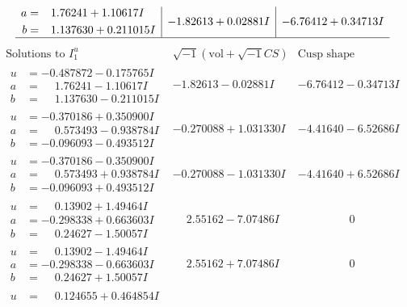 \documentclass[1p]{elsarticle_modified}
\theoremstyle{definition}
\newcommand{\I}{\sqrt{-1}}
\begin{document}
$$\begin{array}{c|c|c}
\begin{aligned}
a &= \phantom{-}1.76241 + 1.10617 I \\
b &= \phantom{-}1.137630 + 0.211015 I\end{aligned}
 & -1.82613 + 0.02881 I & -6.76412 + 0.34713 I\\
 \hline 
 \end{array}$$\newpage$$\begin{array}{c|c|c}  
\text{Solutions to }I^u_{1}& \I (\text{vol} + \sqrt{-1}CS) & \text{Cusp shape}\\
 \hline 
\begin{aligned}
u &= -0.487872 - 0.175765 I \\
a &= \phantom{-}1.76241 - 1.10617 I \\
b &= \phantom{-}1.137630 - 0.211015 I\end{aligned}
 & -1.82613 - 0.02881 I & -6.76412 - 0.34713 I \\ \hline\begin{aligned}
u &= -0.370186 + 0.350900 I \\
a &= \phantom{-}0.573493 - 0.938784 I \\
b &= -0.096093 - 0.493512 I\end{aligned}
 & -0.270088 + 1.031330 I & -4.41640 - 6.52686 I \\ \hline\begin{aligned}
u &= -0.370186 - 0.350900 I \\
a &= \phantom{-}0.573493 + 0.938784 I \\
b &= -0.096093 + 0.493512 I\end{aligned}
 & -0.270088 - 1.031330 I & -4.41640 + 6.52686 I \\ \hline\begin{aligned}
u &= \phantom{-}0.13902 + 1.49464 I \\
a &= -0.298338 + 0.663603 I \\
b &= \phantom{-}0.24627 - 1.50057 I\end{aligned}
 & \phantom{-}2.55162 - 7.07486 I & \phantom{-0.000000 } 0 \\ \hline\begin{aligned}
u &= \phantom{-}0.13902 - 1.49464 I \\
a &= -0.298338 - 0.663603 I \\
b &= \phantom{-}0.24627 + 1.50057 I\end{aligned}
 & \phantom{-}2.55162 + 7.07486 I & \phantom{-0.000000 } 0 \\ \hline\begin{aligned}
u &= \phantom{-}0.124655 + 0.464854 I \\

\end{aligned}
\end{array}$$
\end{document}
